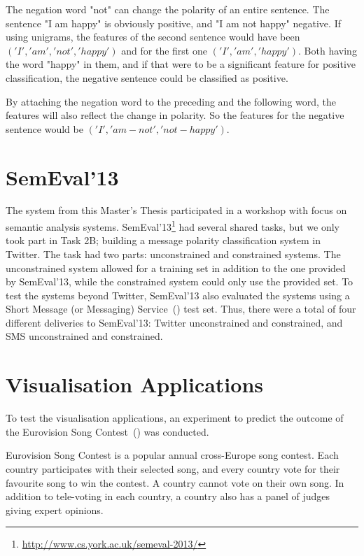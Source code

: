 The negation word "not" can change the polarity of an entire sentence. The sentence "I am happy" is obviously positive, and "I am not happy" negative. If using unigrams, the features of the second sentence would have been $('I', 'am', 'not', 'happy')$ and for the first one $('I', 'am', 'happy')$. Both having the word "happy" in them, and if that were to be a significant feature for positive classification, the negative sentence could be classified as positive.

By attaching the negation word to the preceding and the following word, the features will also reflect the change in polarity. So the features for the negative sentence would be $('I', 'am-not', 'not-happy')$.

\section{SemEval'13}

The system from this Master's Thesis participated in a workshop with focus on semantic analysis systems. SemEval'13\footnote{\url{http://www.cs.york.ac.uk/semeval-2013/}} had several shared tasks, but we only took part in Task 2B; building a message polarity classification system in Twitter. The task had two parts: unconstrained and constrained systems. The unconstrained system allowed for a training set in addition to the one provided by SemEval'13, while the constrained system could only use the provided set. To test the systems beyond Twitter, SemEval'13 also evaluated the systems using a Short Message (or Messaging) Service~() test set. Thus, there were a total of four different deliveries to SemEval'13: Twitter unconstrained and constrained, and SMS unconstrained and constrained.

\section{Visualisation Applications}

To test the visualisation applications, an experiment to predict the outcome of the Eurovision Song Contest~() was conducted.

Eurovision Song Contest is a popular annual cross-Europe song contest. Each country participates with their selected song, and every country vote for their favourite song to win the contest. A country cannot vote on their own song. In addition to tele-voting in each country, a country also has a panel of judges giving expert opinions.

